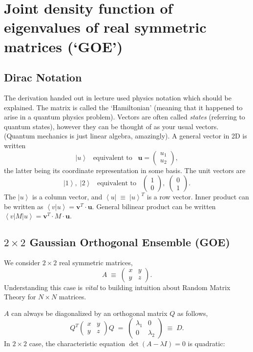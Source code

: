 \documentclass[12pt,letterpaper]{report}
\newcommand\be{\begin{equation}}
\newcommand\ee{\end{equation}}
\newcommand{\bra}[1]{\left\langle #1\right|}
\newcommand{\ket}[1]{\left|#1\right\rangle}
\newcommand{\braket}[2]{\left\langle #1 \left|#2\right.\right\rangle}
\newcommand{\braOket}[3]{\left\langle #1\left|#2\right|#3\right\rangle}
\newcommand{\sym}[3]{\ensuremath{\left(\begin{array}{ll}#1 &#2 \\ #2 &#3%
\end{array}\right)}}
\newcommand{\mbf}[1]{{\mathbf #1}}
\begin{document}
\section{Joint density function of eigenvalues of real symmetric matrices (`GOE')}

\subsection{Dirac Notation}

The derivation handed out in lecture used physics notation which
should be explained. The matrix is called the `Hamiltonian'
(meaning that it happened to arise in a quantum physics problem).
Vectors are often called {\em states} (referring to quantum
states), however they can be thought of as your usual vectors.
(Quantum mechanics is just linear algebra, amazingly). A general
vector in 2D is written \be \ket{u} \;\;\; \mbox{equivalent to}
\;\;\; \mbf{u} = \left(\begin{array}{l}u_1\\ u_2\end{array}
\right), \ee the latter being its coordinate representation in
some basis. The unit vectors are \be \ket{1},\; \ket{2} \;\;\;
\mbox{equivalent to}  \;\;\; \left(\begin{array}{l}1\\
0\end{array}\right), \; \left(\begin{array}{l}0\\
1\end{array}\right). \ee The $\ket{u}$ is a column vector, and
$\bra{u} \; \equiv \; \ket{u}^T$ is a row vector. Inner product
can be written as $\braket{v}{u} = \mbf{v}^T\cdot\mbf{u}$. General
bilinear product can be written $\braOket{v}{M}{u} = \mbf{v}^T
\cdot M \cdot \mbf{u}$.

\subsection{$2\times 2$ Gaussian Orthogonal Ensemble (GOE)}

We consider $2\times 2$ real symmetric matrices, \be A \; \equiv
\; \sym{x}{y}{z}. \ee Understanding this case is {\em vital} to
building intuition about Random Matrix Theory for $N \times N$
matrices.

$A$ can always be diagonalized by an orthogonal matrix $Q$ as
follows, \be \label{eq:diag} Q^T \sym{x}{y}{z} Q  \; = \;
\sym{\lambda_1}{0}{\lambda_2} \; \equiv \; D. \ee In $2\times 2$
case, the characteristic equation $\det (A - \lambda I) = 0$ is
quadratic:
\end{document}
